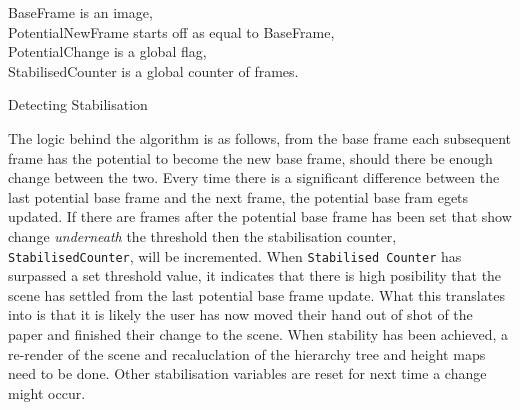\documentclass[11pt]{article}
\begin{document}
\begin{algorithm}
\DontPrintSemicolon
BaseFrame is an image,\\
PotentialNewFrame starts off as equal to BaseFrame,\\
PotentialChange is a global flag,\\
StabilisedCounter is a global counter of frames.

\caption{Detecting Stabilisation}
\label{algo:stabilisation}
\end{algorithm}

The logic behind the algorithm is as follows, from the base frame
each subsequent frame has the potential to become the new base frame, should
there be enough change between the two. Every time there is a significant 
difference between the last potential base frame and the next frame, the
potential base fram egets updated. If there are frames after the potential
base frame has been set that show change \textit{underneath} the threshold
then the stabilisation counter, \texttt{StabilisedCounter}, will be 
incremented. When \texttt{Stabilised Counter} has surpassed a set threshold
value, it indicates that there is high posibility that the scene has
settled from the last potential base frame update. What this translates
into is that it is likely the user has now moved their hand out of shot of the
paper and finished their change to the scene. When stability has been
achieved, a re-render of the scene and recaluclation of the hierarchy tree 
and height maps need to be done. Other stabilisation variables are reset for
next time a change might occur.
\end{document}
